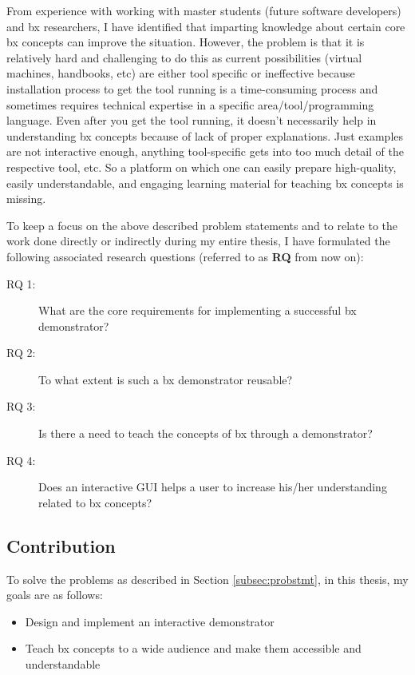 From experience with working with master students (future software developers) and bx researchers, I have identified that imparting knowledge about certain core bx concepts can improve the situation. However, the problem is that it is relatively hard and challenging to do this as current possibilities (virtual machines, handbooks, etc) are either tool specific or ineffective because installation process to get the tool running is a time-consuming process and sometimes requires technical expertise in a specific area/tool/programming language. Even after you get the tool running, it doesn't necessarily help in understanding bx concepts because of lack of proper explanations. Just examples are not interactive enough, anything tool-specific gets into too much detail of the respective tool, etc. So a platform on which one can easily prepare high-quality, easily understandable, and engaging learning material for teaching bx concepts is missing.

To keep a focus on the above described problem statements and to relate to the work done directly or indirectly during my entire thesis, I have formulated the following associated research questions (referred to as \textbf{RQ} from now on):

\begin{description}
	\item [RQ 1:] What are the core requirements for implementing a successful bx demonstrator?
	\item [RQ 2:] To what extent is such a bx demonstrator reusable?
	\item [RQ 3:] Is there a need to teach the concepts of bx through a demonstrator?
	\item [RQ 4:] Does an interactive GUI helps a user to increase his/her understanding related to bx concepts?
\end{description}

\subsection{Contribution}\label{subsec:contribution}
To solve the problems as described in Section \ref{subsec:probstmt}, in this thesis, my goals are as follows:
\begin{itemize} 
\item {Design and implement an interactive demonstrator} 
\item {Teach bx concepts to a wide audience and make them accessible and understandable}
\end{itemize}

